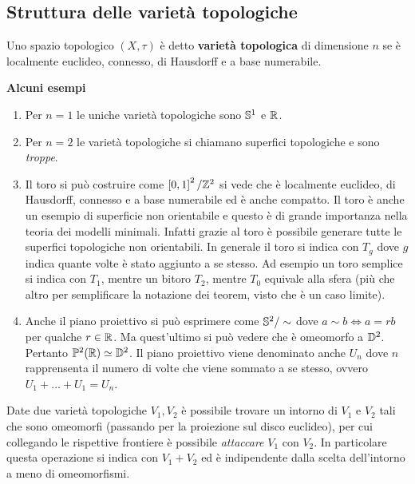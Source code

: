 \subsection{\textcolor{TopAlg}{\textbf{Struttura delle varietà topologiche}}}
\begin{definition}
	Uno spazio topologico $(X,\tau)$ è detto \textbf{varietà topologica} di dimensione $n$ se è localmente euclideo, connesso, di Hausdorff e a base numerabile.
\end{definition}

\textbf{Alcuni esempi}

\begin{enumerate}
	\item Per $n=1$ le uniche varietà topologiche sono $\S^1$ e $\R$.
	\item Per $n=2$ le varietà topologiche si chiamano superfici topologiche e sono \textit{troppe}.
	\item Il toro si può costruire come $\left[0,1\right]^2/\Z^2$ si vede che è localmente euclideo, di Hausdorff, connesso e a base numerabile ed è anche compatto. Il toro è anche un esempio di superficie non orientabile e questo è di grande importanza nella teoria dei modelli minimali. Infatti grazie al toro è possibile generare tutte le superfici topologiche non orientabili. In generale il toro si indica con $T_g$ dove $g$ indica quante volte è stato aggiunto a  se stesso. Ad esempio un toro semplice si indica con $T_1$, mentre un bitoro $T_2$, mentre $T_0$ equivale alla sfera (più che altro per semplificare la notazione dei teorem, visto che è un caso limite).
	\item Anche il piano proiettivo si può esprimere come $\S^2 / \sim$ dove $a \sim b \Leftrightarrow a = rb$ per qualche $r \in \R$. Ma quest'ultimo si può vedere che è omeomorfo a $\D^2$. Pertanto $\mathbb{P}^2(\R) \simeq \D^2$. Il piano proiettivo viene denominato anche $U_n$ dove $n$ rapprensenta il numero di volte che viene sommato a se stesso, ovvero $U_1 + \dots + U_1 = U_n$.
\end{enumerate}

\begin{definition}
	Date due varietà topologiche $V_1, V_2$ è possibile trovare un intorno di $V_1$ e $V_2$ tali che sono omeomorfi (passando per la proiezione sul disco euclideo), per cui collegando le rispettive frontiere è possibile \textit{attaccare} $V_1$ con $V_2$. In particolare questa operazione si indica con $V_1 + V_2$ ed è indipendente dalla scelta dell'intorno a meno di omeomorfismi. 
\end{definition}


